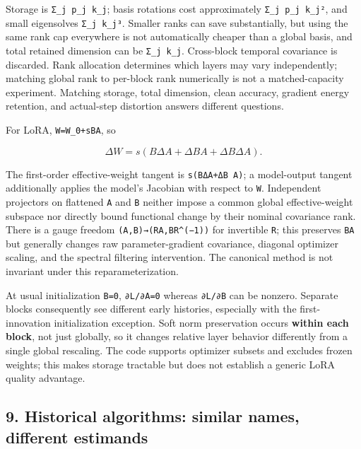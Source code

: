 \documentclass[
  british,
  10pt,
  a4paper,
]{article}
\begin{document}
Storage is
\texttt{Σ\_\allowbreak{}j \allowbreak{}p\_\allowbreak{}j \allowbreak{}k\_\allowbreak{}j};
basis rotations cost approximately
\texttt{Σ\_\allowbreak{}j \allowbreak{}p\_\allowbreak{}j \allowbreak{}k\_\allowbreak{}j²},
and small eigensolves \texttt{Σ\_j\ k\_j³}. Smaller ranks can save
substantiall\allowbreak{}y,\allowbreak{} but using the same rank cap
everywhere is not automatically cheaper than a global basis, and total
retained dimension can be \texttt{Σ\_j\ k\_j}. Cross-\allowbreak{}block
temporal covariance is discarded. Rank allocation determines which
layers may vary independently; matching global rank to per-block rank
numerically is not a matched-\allowbreak{}capacity
experiment.\allowbreak{} Matching storage, total dimension, clean
accuracy, gradient energy retention, and actual-\allowbreak{}step
distortion answers different questions.

For LoRA, \texttt{W=W\_0+sBA}, so

\[
\Delta W=s(B\Delta A+\Delta B A+\Delta B\Delta A).
\]

The first-\allowbreak{}order effective-\allowbreak{}weight tangent is
\texttt{s(BΔA+ΔB \allowbreak{}A)}; a model-\allowbreak{}output tangent
additionally applies the model's Jacobian with respect to \texttt{W}.
Independent projectors on flattened \texttt{A} and \texttt{B} neither
impose a common global effective-\allowbreak{}weight subspace nor
directly bound functional change by their nominal covariance rank. There
is a gauge freedom
\texttt{(A,\allowbreak{}B)→(RA,\allowbreak{}BR\textasciicircum{}(−1))}
for invertible \texttt{R}; this preserves \texttt{BA} but generally
changes raw parameter-\allowbreak{}gradient covariance,\allowbreak{}
diagonal optimizer scaling, and the spectral filtering
intervention\allowbreak{}.\allowbreak{} The canonical method is not
invariant under this reparameteri\allowbreak{}zation.\allowbreak{}

At usual initialization \texttt{B=0}, \texttt{∂L/∂A=0} whereas
\texttt{∂L/∂B} can be nonzero. Separate blocks consequently see
different early histories, especially with the
first-\allowbreak{}innovation initialization exception. Soft norm
preservation occurs \textbf{within each block}, not just globally, so it
changes relative layer behavior differently from a single global
rescaling. The code supports optimizer subsets and excludes frozen
weights; this makes storage tractable but does not establish a generic
LoRA quality advantage.

\subsection{9. Historical algorithms: similar names, different
estimands}\label{mathematical-audit--historical-algorithms-similar-names-different-estimands}
\end{document}
